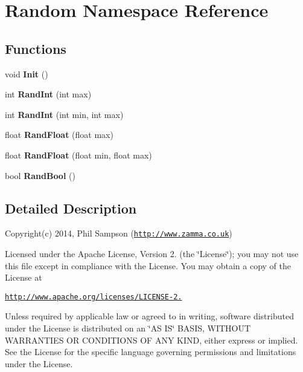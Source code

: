 \hypertarget{namespace_random}{}\section{Random Namespace Reference}
\label{namespace_random}
\subsection*{Functions}
\begin{DoxyCompactItemize}
\item 
\hypertarget{namespace_random_a9feade8fc8026ed3e7aad3b1cdd9b55a}{}void {\bfseries Init} ()\label{namespace_random_a9feade8fc8026ed3e7aad3b1cdd9b55a}

\item 
\hypertarget{namespace_random_a1df1df554acc51763182dc0feffabb45}{}int {\bfseries Rand\+Int} (int max)\label{namespace_random_a1df1df554acc51763182dc0feffabb45}

\item 
\hypertarget{namespace_random_af95f32ab928b256643961ed85ada5d9b}{}int {\bfseries Rand\+Int} (int min, int max)\label{namespace_random_af95f32ab928b256643961ed85ada5d9b}

\item 
\hypertarget{namespace_random_ae424eea89fb07462a98df20e6989942e}{}float {\bfseries Rand\+Float} (float max)\label{namespace_random_ae424eea89fb07462a98df20e6989942e}

\item 
\hypertarget{namespace_random_ac2d5dc2c33542e40dffc0750c5d06e38}{}float {\bfseries Rand\+Float} (float min, float max)\label{namespace_random_ac2d5dc2c33542e40dffc0750c5d06e38}

\item 
\hypertarget{namespace_random_afb12a70247db5c12a6f79134d2d8abc3}{}bool {\bfseries Rand\+Bool} ()\label{namespace_random_afb12a70247db5c12a6f79134d2d8abc3}

\end{DoxyCompactItemize}


\subsection{Detailed Description}
Copyright(c) 2014, Phil Sampson (\href{http://www.zamma.co.uk}{\tt http\+://www.\+zamma.\+co.\+uk})

Licensed under the Apache License, Version 2. (the \char`\"{}\+License\char`\"{}); you may not use this file except in compliance with the License. You may obtain a copy of the License at

\href{http://www.apache.org/licenses/LICENSE-2.0}{\tt http\+://www.\+apache.\+org/licenses/\+L\+I\+C\+E\+N\+S\+E-\/2.}

Unless required by applicable law or agreed to in writing, software distributed under the License is distributed on an \char`\"{}\+A\+S I\+S\char`\"{} B\+A\+S\+I\+S, W\+I\+T\+H\+O\+U\+T W\+A\+R\+R\+A\+N\+T\+I\+E\+S O\+R C\+O\+N\+D\+I\+T\+I\+O\+N\+S O\+F A\+N\+Y K\+I\+N\+D, either express or implied. See the License for the specific language governing permissions and limitations under the License. 